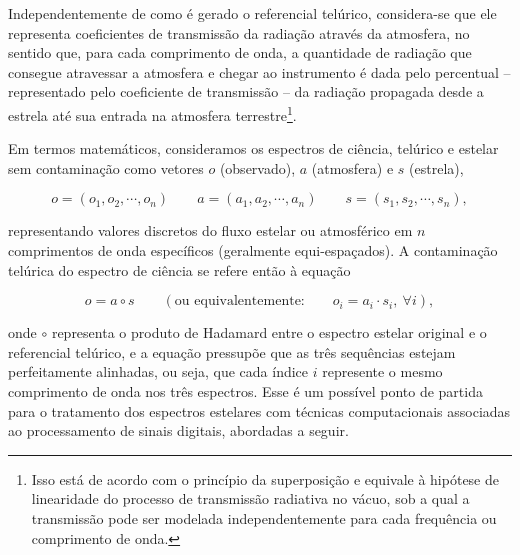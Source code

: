 Independentemente de como é gerado o referencial telúrico, considera-se que ele representa coeficientes de transmissão da radiação através da atmosfera, no sentido que, para cada comprimento de onda, a quantidade de radiação que consegue atravessar a atmosfera e chegar ao instrumento é dada pelo percentual -- representado pelo coeficiente de transmissão -- da radiação propagada desde a estrela até sua entrada na atmosfera terrestre\footnote{Isso está de acordo com o princípio da superposição e equivale à hipótese de linearidade do processo de transmissão radiativa no vácuo, sob a qual a transmissão pode ser modelada independentemente para cada frequência ou comprimento de onda.}. 

Em termos matemáticos, consideramos os espectros de ciência, telúrico e estelar sem contaminação como vetores $o$ (observado), $a$ (atmosfera) e $s$ (estrela),

\begin{equation*}
    o = (o_1, o_2, \cdots, o_{n}) \qquad a = (a_1, a_2, \cdots, a_{n}) \qquad s = (s_1, s_2, \cdots, s_{n}), 
\end{equation*}

\noindent representando valores discretos do fluxo estelar ou atmosférico em $n$ comprimentos de onda específicos (geralmente equi-espaçados). A contaminação telúrica do espectro de ciência se refere então à equação

\begin{equation*}
    o = a \circ s \qquad \left(\mbox{ou equivalentemente:} \qquad o_i = a_i\cdot s_i,\ \forall i\right),
\end{equation*}

\noindent onde $\circ$ representa o produto de Hadamard entre o espectro estelar original e o referencial telúrico, e a equação pressupõe que as três sequências estejam perfeitamente alinhadas, ou seja, que cada índice $i$ represente o mesmo comprimento de onda nos três espectros. Esse é um possível ponto de partida para o tratamento dos espectros estelares com técnicas computacionais associadas ao processamento de sinais digitais, abordadas a seguir.


